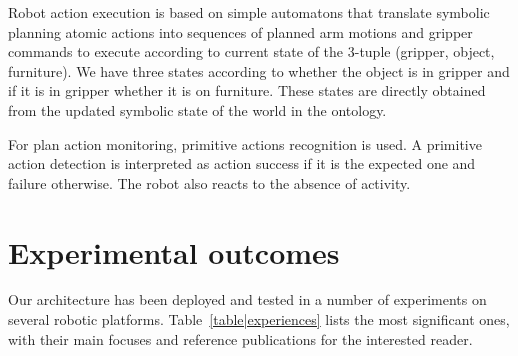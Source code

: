 \documentclass[preprint,3p,times]{elsarticle}
\begin{document}
Robot action execution is based on simple automatons  that translate
symbolic planning atomic actions into sequences of planned arm motions
and gripper commands to execute according to current state
of the 3-tuple (gripper, object, furniture). We have three states
according to whether the object is in gripper and if it is in gripper
whether it is on furniture.  These states are directly obtained from
the updated symbolic state of the world in the ontology.

For plan action monitoring, primitive actions recognition is used. A primitive
action detection is interpreted as action success if it is the expected one and
failure otherwise. The robot also reacts to the absence of activity.




\section{Experimental outcomes}
\label{sec:expe}

Our architecture has been deployed and tested in a number of experiments on
several robotic platforms. Table~\ref{table|experiences} lists the most
significant ones, with their main focuses and reference publications for the
interested reader.
\end{document}
